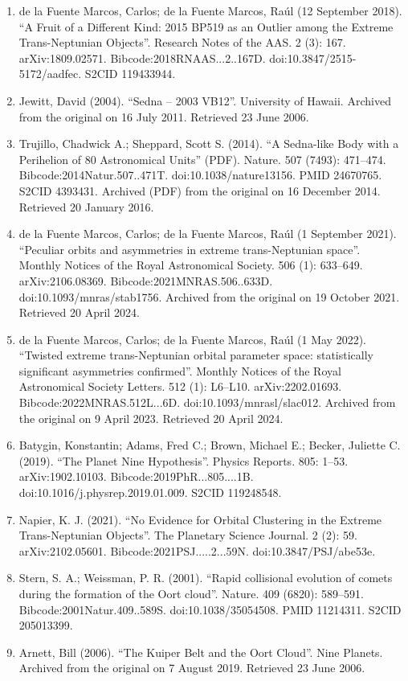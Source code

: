 \begin{enumerate}
\item de la Fuente Marcos, Carlos; de la Fuente Marcos, Raúl (12 September 2018). ``A Fruit of a Different Kind: 2015 BP519 as an Outlier among the Extreme Trans-Neptunian Objects''. Research Notes of the AAS. 2 (3): 167. arXiv:1809.02571. Bibcode:2018RNAAS...2..167D. doi:10.3847/2515-5172/aadfec. S2CID 119433944.
\item Jewitt, David (2004). ``Sedna – 2003 VB12''. University of Hawaii. Archived from the original on 16 July 2011. Retrieved 23 June 2006.
\item Trujillo, Chadwick A.; Sheppard, Scott S. (2014). ``A Sedna-like Body with a Perihelion of 80 Astronomical Units'' (PDF). Nature. 507 (7493): 471–474. Bibcode:2014Natur.507..471T. doi:10.1038/nature13156. PMID 24670765. S2CID 4393431. Archived (PDF) from the original on 16 December 2014. Retrieved 20 January 2016.
\item de la Fuente Marcos, Carlos; de la Fuente Marcos, Raúl (1 September 2021). ``Peculiar orbits and asymmetries in extreme trans-Neptunian space''. Monthly Notices of the Royal Astronomical Society. 506 (1): 633–649. arXiv:2106.08369. Bibcode:2021MNRAS.506..633D. doi:10.1093/mnras/stab1756. Archived from the original on 19 October 2021. Retrieved 20 April 2024.
\item de la Fuente Marcos, Carlos; de la Fuente Marcos, Raúl (1 May 2022). ``Twisted extreme trans-Neptunian orbital parameter space: statistically significant asymmetries confirmed''. Monthly Notices of the Royal Astronomical Society Letters. 512 (1): L6–L10. arXiv:2202.01693. Bibcode:2022MNRAS.512L...6D. doi:10.1093/mnrasl/slac012. Archived from the original on 9 April 2023. Retrieved 20 April 2024.
\item Batygin, Konstantin; Adams, Fred C.; Brown, Michael E.; Becker, Juliette C. (2019). ``The Planet Nine Hypothesis''. Physics Reports. 805: 1–53. arXiv:1902.10103. Bibcode:2019PhR...805....1B. doi:10.1016/j.physrep.2019.01.009. S2CID 119248548.
\item Napier, K. J. (2021). ``No Evidence for Orbital Clustering in the Extreme Trans-Neptunian Objects''. The Planetary Science Journal. 2 (2): 59. arXiv:2102.05601. Bibcode:2021PSJ.....2...59N. doi:10.3847/PSJ/abe53e.
\item Stern, S. A.; Weissman, P. R. (2001). ``Rapid collisional evolution of comets during the formation of the Oort cloud''. Nature. 409 (6820): 589–591. Bibcode:2001Natur.409..589S. doi:10.1038/35054508. PMID 11214311. S2CID 205013399.
\item Arnett, Bill (2006). ``The Kuiper Belt and the Oort Cloud''. Nine Planets. Archived from the original on 7 August 2019. Retrieved 23 June 2006.

\end{enumerate}
